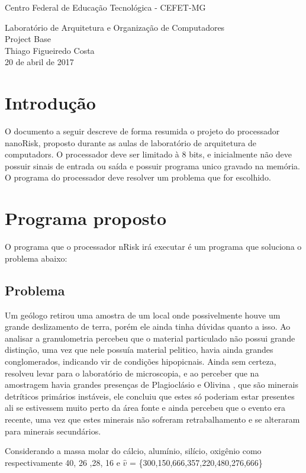 \documentclass[a4paper, 10pt]{article}
\begin{document}
{\Large \centering Centro Federal de Educação Tecnológica - CEFET-MG\\}
\begin{center}
{\huge Laboratório de Arquitetura e Organização de Computadores\\} 
{\LARGE Project Base\\[7.5cm]}
{\Large Thiago Figueiredo Costa\\ \vfill}
{\Large 20 de abril de 2017}
\end{center}

\newpage
\section{Introdução}
O documento a seguir descreve de forma resumida o projeto do processador nanoRisk, proposto durante as aulas de laboratório de arquitetura de computadors. O processador deve ser limitado à 8 bits, e inicialmente não deve possuir sinais de entrada ou saída e possuir programa unico gravado na memória. O programa do processador deve resolver um problema que for escolhido.
\newpage
\section{Programa proposto}
O programa que o processador nRisk irá executar é um programa que soluciona o problema abaixo:
\subsection{Problema}
Um geólogo retirou uma amostra de um local onde possivelmente houve um grande deslizamento de terra, porém ele ainda tinha dúvidas quanto a isso. Ao analisar a granulometria percebeu que o material particulado não possui grande distinção, uma vez que nele possuía material pelitico, havia ainda grandes conglomerados, indicando vir de condições hipopicnais. Ainda sem certeza, resolveu levar para o laboratório de microscopia, e ao perceber que na amostragem havia grandes presenças de Plagioclásio e Olivina , que são minerais detríticos primários instáveis, ele concluiu que estes só poderiam estar presentes ali se estivessem muito perto da área fonte e ainda percebeu que o evento era recente, uma vez que estes minerais não sofreram retrabalhamento e se alteraram para minerais secundários. 

Considerando a massa molar do cálcio, alumínio, silício, oxigênio como respectivamente 40, 26 ,28, 16 e $\hat{v}$ = \{300,150,666,357,220,480,276,666\}
\end{document}
